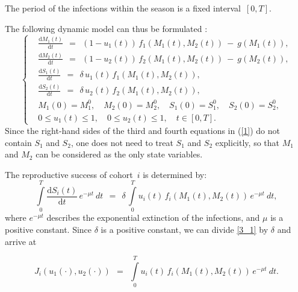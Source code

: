 \documentclass[11pt]{amsart}
\begin{document}
The period of the infections within the season is a fixed interval~$ [0, T] $.

The following dynamic model can thus be formulated 
\cite{YegorovGrognardMailleretHalkettBernhard2019}:
\begin{equation}
\left\{ \begin{aligned}
& \frac{\mathrm{d} M_1(t)}{\mathrm{d} t} \:\: = \:\: \left(1 - u_1(t)\right) \,
  f_1\left(M_1(t), M_2(t)\right) \: - \: g\left(M_1(t)\right), \\
& \frac{\mathrm{d} M_2(t)}{\mathrm{d} t} \:\: = \:\: \left(1 - u_2(t)\right) \,
  f_2\left(M_1(t), M_2(t)\right) \: - \: g\left(M_2(t)\right), \\
& \frac{\mathrm{d} S_1(t)}{\mathrm{d} t} \:\: = \:\: \delta \, u_1(t) \,
  f_1\left(M_1(t), M_2(t)\right), \\
& \frac{\mathrm{d} S_2(t)}{\mathrm{d} t} \:\: = \:\: \delta \, u_2(t) \,
  f_2\left(M_1(t), M_2(t)\right), \\
& M_1(0) = M_1^0, \quad M_2(0) = M_2^0, \quad S_1(0) = S_1^0,
  \quad S_2(0) = S_2^0, \\
& 0 \leqslant u_1(t) \leqslant 1, \quad 0 \leqslant u_2(t) \leqslant 1,
  \quad t \in [0, T].
\end{aligned} \right.  \label{1}
\end{equation}
Since the right-hand sides of the third and fourth equations in (\ref{1}) do
not contain $ S_1 $ and $ S_2 $, one does not need to treat $ S_1 $ and $ S_2 $
explicitly, so that $ M_1 $ and $ M_2 $ can be considered as the only
state variables. %

The reproductive success of cohort~$ i $ is determined by:
\begin{equation}
\int\limits_0^T \frac{\mathrm{d} S_i(t)}{\mathrm{d} t} \, e^{-\mu t}
    \: dt \:\: = \:\: \delta \,
\int\limits_0^T u_i(t) \, f_i\left(M_1(t), M_2(t)\right) \, e^{-\mu t} \: dt,  \label{3_1}
\end{equation}
where $ e^{-\mu t} $ describes the exponential extinction of the infections,
and $ \mu $ is a positive constant. Since $ \delta $ is a positive constant,
we can divide \cref{3_1} by $ \delta $ and arrive at

\begin{equation}
J_i\left(u_1(\cdot), u_2(\cdot)\right) \:\: = \:\: \int\limits_0^T u_i(t) \, f_i\left(M_1(t),
  M_2(t)\right) \, e^{-\mu t} \: dt.  \label{3}
\end{equation}
\end{document}
